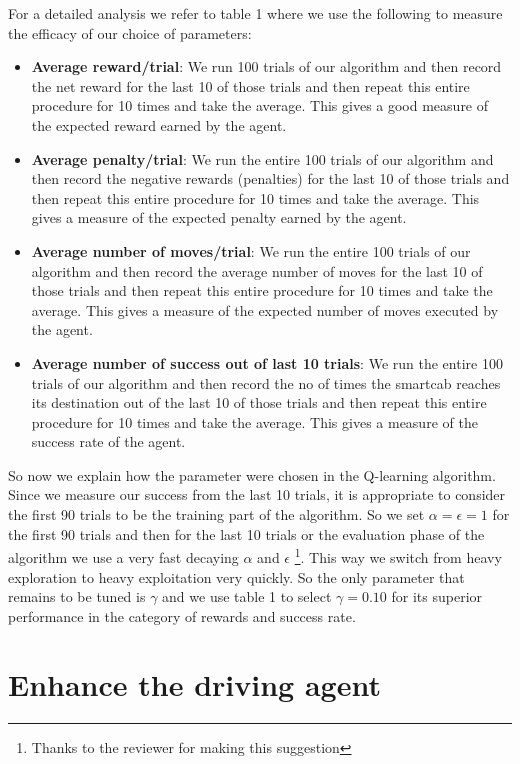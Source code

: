 \documentclass{article}
\begin{document}
For a detailed analysis we refer to table 1 where we use the following to measure the efficacy of our choice of parameters:
\begin{itemize}
\item \textbf{Average reward/trial}: We run 100 trials of our algorithm and then record the net reward for the last 10 of those trials and then repeat this entire procedure for 10 times and take the average. This gives a good measure of the expected reward earned by the agent.
\item \textbf{Average penalty/trial}: We run the entire 100 trials of our algorithm and then record the negative rewards (penalties) for the last 10 of those trials and then repeat this entire procedure for 10 times and take the average. This gives a measure of the expected penalty earned by the agent.
\item \textbf{Average number of moves/trial}: We run the entire 100 trials of our algorithm and then record the average number of moves for the last 10 of those trials and then repeat this entire procedure for 10 times and take the average. This gives a measure of the expected number of moves executed by the agent.
\item \textbf{Average number of success out of last 10 trials}: We run the entire 100 trials of our algorithm and then record the no of times the smartcab reaches its destination out of the last 10 of those trials and then repeat this entire procedure for 10 times and take the average. This gives a measure of the success rate of the agent.
\end{itemize}  

So now we explain how the parameter were chosen in the Q-learning algorithm. Since we measure our success from the last 10 trials, it is appropriate to consider the first 90 trials to be the training part of the algorithm. So we set $\alpha=\epsilon=1$ for the first 90 trials and then for the last 10 trials or the evaluation phase of the algorithm we use a very fast decaying $\alpha$ and $\epsilon$ \footnote{Thanks to the reviewer for making this suggestion}. This way we switch from heavy exploration to heavy exploitation very quickly. So the only parameter that remains to be tuned is $\gamma$ and we use table 1 to select $\gamma = 0.10$ for its superior performance in the category of rewards and success rate.


\section{Enhance the driving agent}
\end{document}
